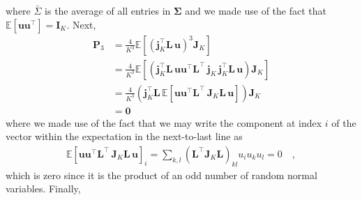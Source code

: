 \documentclass[modern]{aastex62}
\begin{document}
%
where $\bar{\Sigma}$ is the average of all entries in $\pmb{\Sigma}$ and
we made use of the fact that $\mathbb{E}\left[ \mathbf{u} \mathbf{u}^\top\right] = \mathbf{I}_K$.
%
Next,
%
\begin{align}
    \mathbf{P}_3 & = \frac{4}{K^3}\mathbb{E}\left[ \left(\mathbf{j}_K^\top \mathbf{L} \, \mathbf{u}\right)^3 \mathbf{J}_K \right]
    \nonumber                                                                                                                                                                                                                    \\
                 & = \frac{4}{K^3}\mathbb{E}\left[\left(\mathbf{j}_K^\top \mathbf{L} \,  \mathbf{u} \mathbf{u}^\top  \mathbf{L}^\top \, \mathbf{j}_K \, \mathbf{j}_K^\top \mathbf{L} \,  \mathbf{u} \right) \mathbf{J}_K \right]
    \nonumber                                                                                                                                                                                                                    \\
                 & = \frac{4}{K^3}\left(\mathbf{j}_K^\top \mathbf{L} \,  \mathbb{E}\left[\mathbf{u} \mathbf{u}^\top  \mathbf{L}^\top \, \mathbf{J}_K \mathbf{L} \,  \mathbf{u}\right] \right) \mathbf{J}_K
    \nonumber                                                                                                                                                                                                                    \\
                 & = \mathbf{0}
\end{align}
%
where we made use of the fact that we may write the component at index $i$ of the vector within the expectation in the next-to-last line
as
\begin{align}
    \mathbb{E}\left[\mathbf{u} \mathbf{u}^\top  \mathbf{L}^\top \, \mathbf{J}_K \mathbf{L} \,  \mathbf{u}\right]_{i} = \sum\limits_{k,l}(\mathbf{L}^\top \mathbf{J}_K \mathbf{L})_{kl} u_i u_k u_l = 0
    \quad,
    \nonumber
\end{align}
%
which is zero since it is the product of an odd number of random normal variables.
Finally,
%
\end{document}
